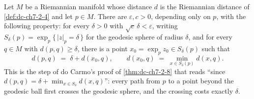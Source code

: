 \begin{lemma}
  \label{lem:dc-ch7-2-8-sphere-min}
  \leanok
  Let $M$ be a Riemannian manifold whose distance $d$ is the Riemannian
  distance of \cref{def:dc-ch7-2-4} and let $p\in M$. There are
  $\varepsilon, c>0$, depending only on $p$, with the following property: for
  every $\delta>0$ with $\sqrt c\,\delta<\varepsilon$, writing
  $S_\delta(p)=\exp_p\{\,|z|_p=\delta\,\}$ for the geodesic sphere of radius
  $\delta$, and for every $q\in M$ with $d(p,q)\ge\delta$, there is a point
  $x_0=\exp_p z_0\in S_\delta(p)$ such that
  $$
  d(p,q)\;=\;\delta+d(x_0,q),
  \qquad
  d(x_0,q)\;=\;\min_{x\in S_\delta(p)} d(x,q).
  $$
  This is the step of do Carmo's proof of \cref{thm:dc-ch7-2-8} that reads
  ``since $d(p,q)=\delta+\min_{x\in S_\delta}d(x,q)$'': every path from $p$ to
  a point beyond the geodesic ball first crosses the geodesic sphere, and the
  crossing costs exactly $\delta$.
\end{lemma}
